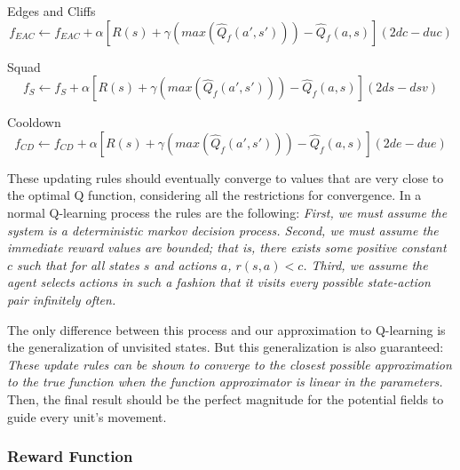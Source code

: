 \begin{flushleft}
Edges and Cliffs
\begin{equation}
f_{EAC}  \leftarrow f_{EAC}  + \alpha [ R(s) + \gamma (max(\hat{Q}_{f} (a',s')))-\hat{Q}_{f} (a,s) ] (2dc - duc)
\end{equation}
\end{flushleft} 

\begin{flushleft}
Squad 
\begin{equation}
f_{S}  \leftarrow f_{S}  + \alpha [ R(s) + \gamma (max(\hat{Q}_{f} (a',s')))-\hat{Q}_{f} (a,s) ] (2ds - dsv)
\end{equation}
\end{flushleft} 

\begin{flushleft}
Cooldown
\begin{equation}
f_{CD}  \leftarrow f_{CD}  + \alpha [ R(s) + \gamma (max(\hat{Q}_{f} (a',s')))-\hat{Q}_{f} (a,s) ](2de - due)
\end{equation}
\end{flushleft} 

These updating rules should eventually converge to values that are very close to the optimal Q function, considering all the restrictions for convergence. In a normal Q-learning process the rules are the following: \textit{First, we must assume the system is a deterministic markov decision process. Second, we must assume the immediate reward values are bounded; that is, there exists some positive constant $c$ such that for all states $s$ and actions $a$, $r(s,a) < c$. Third, we assume the agent selects actions in such a fashion that it visits every possible state-action pair infinitely often.} \cite[p377]{ml_tom_mitchel} 

The only difference between this process and our approximation to Q-learning is the generalization of unvisited states. But this generalization is also guaranteed: \textit{These update rules can be shown to converge to the closest possible approximation to the true function when the function approximator is linear in the parameters. }\cite[p779]{rl} Then, the final result should be the perfect magnitude for the potential fields to guide every unit's movement.


\subsubsection{Reward Function}

